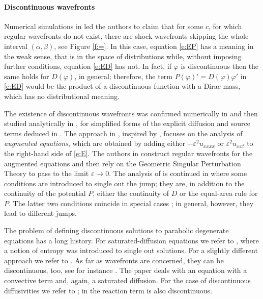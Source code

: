 \documentclass[11pt,a4paper]{article}
\renewcommand{\epsilon}{\varepsilon}
\newcommand{\eps}{\epsilon}
\renewcommand{\phi}{\varphi}
\begin{document}
\paragraph{Discontinuous wavefronts} Numerical simulations in \cite[p. 13]{JBMS} led the authors to claim that for some $c$, for which regular wavefronts do not exist,
there are shock wavefronts skipping the whole interval $(\alpha,\beta)$, see Figure \ref{f:=}. In this case, equation \eqref{e:EP} has a meaning in the weak sense, that is in the space of distributions while, without imposing further conditions, equation \eqref{e:ED} has not. In fact, if $\phi$ is discontinuous then the same holds for $D(\phi)$, in general; therefore, the term $P(\phi)'=D(\phi)\phi'$ in \eqref{e:ED} would be the product of a discontinuous function with a Dirac mass, which has no distributional meaning.

The existence of discontinuous wavefronts was confirmed numerically in \cite[\S 4.3]{LHMS} and then studied analytically in \cite{Li2021}, for simplified forms of the explicit diffusion and source terms deduced in \cite{JBMS}. The approach in \cite{Li2021}, inspired by \cite{Witelski}, focuses on the analysis of {\em augmented equations}, which are obtained by adding either $-\epsilon^2u_{xxxx}$ or $\epsilon^2u_{xxt}$ to the right-hand side of \eqref{e:E}. The authors in \cite{Li2021} construct regular wavefronts for the augmented equations and then rely on the Geometric Singular Perturbation Theory to pass to the limit $\eps\to0$. The analysis of \cite{Li2021} is continued in \cite{MTMWBH2} where some conditions are introduced to single out the jump; they are, in addition to the continuity of the potential $P$, either the continuity of $D$ or  the equal-area rule for $P$. The latter two conditions coincide in special cases \cite{MTMWBH}; in general, however, they lead to different jumps.

The problem of defining discontinuous solutions to parabolic degenerate equations has a long history. For saturated-diffusion equations we refer to \cite{Bertsch-DalPasso}, where a notion of entropy was introduced to single out solutions. For a slightly different approach 
we refer to \cite{CCCSS_2015, Caselles_entropy, Caselles_flux-limited}. As far as wavefronts are concerned, they can be discontinuous, too, see for instance \cite{CCCSS_qualitative, Chertock-Kurganov-Rosenau_2005,Goodman-Kurganov-Rosenau, Kurganov-Rosenau}. The paper \cite{Campos-Corli-Malaguti} deals with an equation with a convective term and, again, a saturated diffusion. For the case of discontinuous diffusivities we refer to \cite{Drabek-SKZ, Drabek-Zahradinkova21, Drabek-Zahradinkova23}; in \cite{Guarnotta-Marcelli} the reaction term is also discontinuous. 
\end{document}
